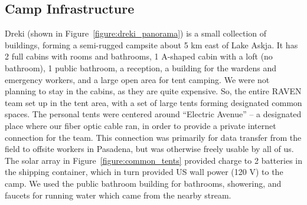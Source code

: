 \subsection{Camp Infrastructure}

Dreki (shown in Figure~\ref{figure:dreki_panorama}) is a small collection of buildings,
forming a semi-rugged campsite about 5 km east of Lake Askja.
It has 2 full cabins with rooms and bathrooms, 1 A-shaped cabin with a loft (no bathroom),
1 public bathroom, a reception, a building for the wardens and emergency workers,
and a large open area for tent camping.
We were not planning to stay in the cabins, as they are quite expensive.
So, the entire RAVEN team set up in the tent area,
with a set of large tents forming designated common spaces.
The personal tents were centered around ``Electric Avenue'' -- a designated place where our
fiber optic cable ran, in order to provide a private internet connection for the team.
This connection was primarily for data transfer from the field to offsite workers in Pasadena,
but was otherwise freely usable by all of us.
The solar array in Figure~\ref{figure:common_tents}
provided charge to 2 batteries in the shipping container,
which in turn provided US wall power (120 V) to the camp.
We used the public bathroom building for bathrooms, showering, and faucets for running water
which came from the nearby stream.

